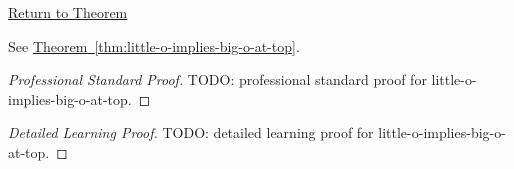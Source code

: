 \newpage
{}
\label{prf:little-o-implies-big-o-at-top}

\begin{remark*}[Return]
\hyperref[thm:little-o-implies-big-o-at-top]{Return to Theorem}
\end{remark*}

\begin{theorem*}
See \hyperref[thm:little-o-implies-big-o-at-top]{Theorem~\ref*{thm:little-o-implies-big-o-at-top}}.
\end{theorem*}

\begin{proof}[Professional Standard Proof]
\LRAProofBodyStart
TODO: professional standard proof for little-o-implies-big-o-at-top.
\end{proof}

\begin{proof}[Detailed Learning Proof]
\LRAProofBodyStart
TODO: detailed learning proof for little-o-implies-big-o-at-top.
\end{proof}

\begin{remark*}
\end{remark*}

\begin{dependencies}
\NoLocalDependencies
\end{dependencies}

\clearpage
